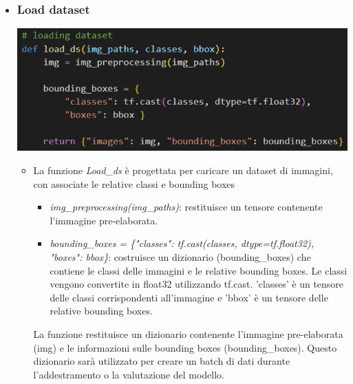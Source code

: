 \documentclass{report}
\begin{document}
\begin{itemize}
\item
\subsubsection{Load dataset}
\includegraphics[height=%
0.18\textheight]{load}\\
\begin{itemize}
\item La funzione {\itshape Load\_ds} è progettata per caricare un dataset di immagini, con associate le relative classi e bounding boxes
\begin{itemize}
\item {\itshape img\_preprocessing(img\_paths)}: restituisce un tensore contenente l'immagine pre-elaborata.

\item {\itshape bounding\_boxes = \{"classes": tf.cast(classes, dtype=tf.float32), "boxes": bbox\}}: costruisce un dizionario (bounding\_boxes) che contiene le classi delle immagini e le relative bounding boxes. Le classi vengono convertite in float32 utilizzando tf.cast. 'classes' è un tensore delle classi corrispondenti all'immagine e 'bbox' è un tensore delle relative bounding boxes.

\end{itemize}
La funzione restituisce un dizionario contenente l'immagine pre-elaborata (img) e le informazioni sulle bounding boxes (bounding\_boxes). Questo dizionario sarà utilizzato per creare un batch di dati durante l'addestramento o la valutazione del modello.
\end{itemize}
\end{itemize}
\end{document}
